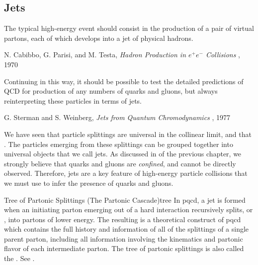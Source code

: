 

\subsection{Jets}
\label{sec:jet-intro}

\epigraph{The typical high-energy event should consist in the production of a pair of virtual partons, each of which develops into a jet of physical hadrons.}{N. Cabibbo, G. Parisi, and M. Testa, \textit{Hadron Production in \(e^+ e^-\) Collisions} \cite{}, 1970}

\epigraph{Continuing in this way, it should be possible to test the detailed predictions of QCD for production of any numbers of quarks and gluons, but always reinterpreting
these particles in terms of jets.}{G. Sterman and S. Weinberg, \textit{Jets from Quantum Chromodynamics} \cite{}, 1977}


We have seen that particle splittings are universal in the collinear limit, and that .
%
The particles emerging from these splittings can be grouped together into universal objects that we call jets.
%
As discussed in  of the previous chapter, we strongly believe that quarks and gluons are \textit{confined}, and cannot be directly observed.
%
Therefore, jets are a key feature of high-energy particle collisions that we must use to infer the presence of quarks and gluons.




\begin{definitionbox}{Tree of Partonic Splittings (The Partonic Cascade)}{tree}
    In \gls{pqcd}, a jet is formed when an initiating parton emerging out of a hard interaction recursively splits, or , into partons of lower energy.
    The resulting  is a theoretical construct of \gls{pqcd} which contains the full history and information of all of the splittings of a single parent parton, including all information involving the kinematics and partonic flavor of each intermediate parton.
    The tree of partonic splittings is also called the .
    See \Fig{}.
\end{definitionbox}

